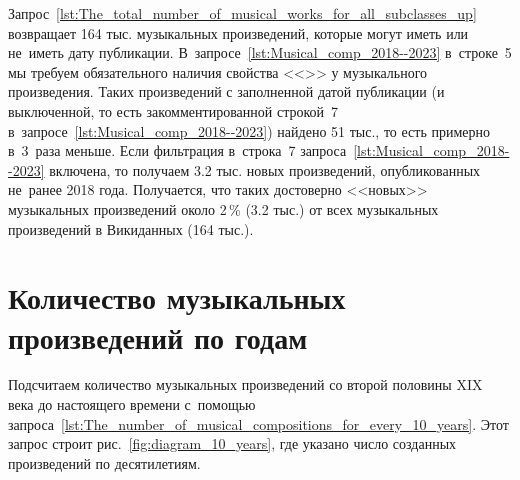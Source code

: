 


Запрос~\ref{lst:The_total_number_of_musical_works_for_all_subclasses_up} 
возвращает 164 тыс. музыкальных произведений, которые могут иметь или не~иметь дату публикации. 
В~запросе~\ref{lst:Musical_comp_2018--2023} в~строке~5 
мы требуем обязательного наличия свойства <<>> у музыкального произведения.
Таких произведений с заполненной датой публикации 
(и выключенной, 
 то есть закомментированной строкой~7 в~запросе~\ref{lst:Musical_comp_2018--2023}) найдено 51 тыс., 
то есть примерно в~3~раза меньше. 
Если фильтрация в~строка~7 запроса~\ref{lst:Musical_comp_2018--2023} включена, 
то получаем 3.2 тыс. новых произведений, опубликованных не~ранее 2018 года. 
Получается, что таких достоверно <<новых>> музыкальных произведений 
около 2\,\% (3.2 тыс.) от всех музыкальных произведений в Викиданных (164 тыс.).






\section{Количество музыкальных произведений по годам}

Подсчитаем количество музыкальных произведений 
со второй половины XIX века до настоящего времени 
с~помощью запроса~\ref{lst:The_number_of_musical_compositions_for_every_10_years}. 
Этот запрос строит рис.~\ref{fig:diagram_10_years}, где 
указано число созданных произведений по десятилетиям. 



